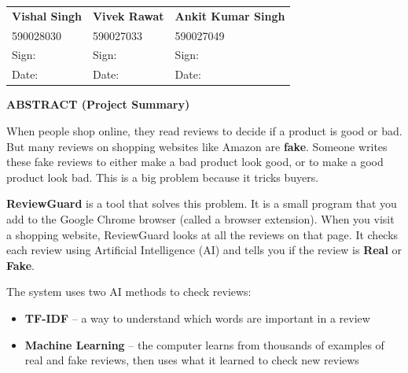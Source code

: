 \documentclass[10pt, a4paper]{report}
\begin{document}
\vspace{2cm}

\begin{tabular}{p{}p{}p{}}
  \textbf{Vishal Singh} & \textbf{Vivek Rawat} & \textbf{Ankit Kumar Singh} \\
  590028030 & 590027033 & 590027049 \\[1.5cm]
  Sign: \underline{\hspace{2.5cm}} & Sign: \underline{\hspace{2.5cm}} & Sign: \underline{\hspace{2.5cm}} \\[0.5cm]
  Date: \underline{\hspace{2.5cm}} & Date: \underline{\hspace{2.5cm}} & Date: \underline{\hspace{2.5cm}} \\
\end{tabular}

\newpage
\begin{center}
  {\Large\bfseries\color{myblue} ABSTRACT (Project Summary)}
\end{center}
\vspace{0.5cm}
\onehalfspacing

When people shop online, they read reviews to decide if a product is good or bad. But many reviews on shopping websites like Amazon are \textbf{fake}. Someone writes these fake reviews to either make a bad product look good, or to make a good product look bad. This is a big problem because it tricks buyers.

\textbf{ReviewGuard} is a tool that solves this problem. It is a small program that you add to the Google Chrome browser (called a browser extension). When you visit a shopping website, ReviewGuard looks at all the reviews on that page. It checks each review using Artificial Intelligence (AI) and tells you if the review is \textbf{Real} or \textbf{Fake}.

The system uses two AI methods to check reviews:
\begin{itemize}
  \item \textbf{TF-IDF} -- a way to understand which words are important in a review
  \item \textbf{Machine Learning} -- the computer learns from thousands of examples of real and fake reviews, then uses what it learned to check new reviews
\end{itemize}
\end{document}
